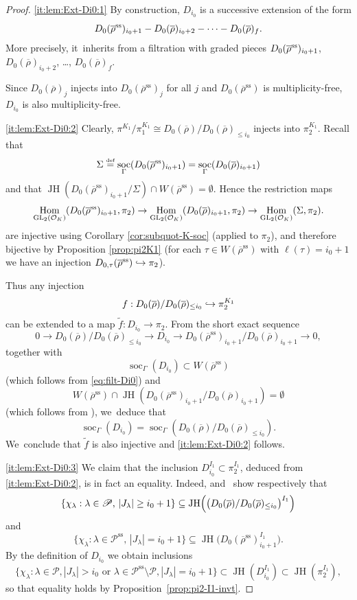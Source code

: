 \documentclass[JEP,XML,SOM,Unicode,NoFloatCountersInSection, NoEqCountersInSection,published]{cedram}
\newcommand\hto{\mathrel{\lhook\joinrel\to}}
\let\wt\widetilde
\newcommand{\defeq}{\stackrel{\textrm{\tiny{\upshape{def}}}}{=}}
\newcommand{\cO}{\mathcal{O}}
\renewcommand{\P}{\mathscr P}
\renewcommand{\ss}{\mathrm{ss}}
\newcommand{\brho}{\overline{\rho}}
\DeclareMathOperator{\GL}{GL}
\DeclareMathOperator{\Hom}{Hom}
\DeclareMathOperator{\JH}{\mathrm{JH}}
\DeclareMathOperator{\soc}{soc}
\theoremstyle{plain}
\theoremstyle{definition}
\begin{document}
\skpt
\begin{proof}
\eqref{it:lem:Ext-Di0:1}
By construction, $D_{i_0}$ is a successive extension of the form
\begin{equation}\label{eq:filt-Di0}D_{0}(\brho^{\rm ss})_{i_0+1} \-- D_0(\brho)_{i_0+2}\-- \cdots\-- D_0(\brho)_{f}.
\end{equation}
More precisely, it~inherits from \cite[Eq.\,(65)]{BHHMS4} a filtration with graded pieces $D_{0}(\brho^{\rm ss})_{i_0+1}$, $D_0(\brho)_{i_0+2}$, \dots, $D_0(\brho)_{f}$.

Since $D_{0}(\brho)_j$ injects into $D_0(\brho^{\ss})_j$ for all $j$ and $D_0(\brho^{\ss})$ is multiplicity-free, $D_{i_0}$ is also multiplicity-free.

\eqref{it:lem:Ext-Di0:2}
Clearly, $\pi^{K_1}/\pi_1^{K_1} \cong D_0(\brho)/D_0(\brho)_{\leq i_0}$ injects into $\pi_2^{K_1}$.
Recall that
\[
\Sigma\defeq \soc_{\Gamma} (D_0(\brho^{\ss})_{i_0+1}) =\soc_{\Gamma} (D_0(\brho)_{i_0+1})
\]
and that $\JH(D_0(\brho^{\ss})_{i_0+1}/\Sigma) \cap W(\brho^\ss) = \emptyset$.
Hence the restriction maps
\begin{equation*}\let\ra\rightarrow
\Hom_{\GL_2(\cO_K)}(D_0(\brho^{\ss})_{i_0+1},\pi_2) \ra \Hom_{\GL_2(\cO_K)}(D_0(\brho)_{i_0+1},\pi_2) \ra \Hom_{\GL_2(\cO_K)}(\Sigma,\pi_2).
\end{equation*}
are injective using Corollary \ref{cor:subquot-K-soc} (applied to $\pi_2$), and therefore bijective by Proposition \ref{prop:pi2K1} (for each $\tau \in W(\brho^\ss)$ with $\ell(\tau)=i_0+1$ we have an injection $D_{0,\tau}(\brho^\ss) \hto \pi_2$).

Thus any injection
\[
f: D_0(\brho)/D_0(\brho)_{\leq i_0} \hto \pi_2^{K_1}
\]
can be extended to a map $\wt f: D_{i_0} \to \pi_2$.
From the short exact sequence
\[
0 \to D_0(\brho)/D_0(\brho)_{\le i_0} \to D_{i_0} \to D_0(\brho^{\ss})_{i_0+1}/D_0(\brho)_{i_0+1} \to 0,
\]
together with
\[
\soc_\Gamma(D_{i_0})\subset W(\brho^\ss)
\]
(which follows from \eqref{eq:filt-Di0}) and
\[
W(\brho^\ss) \cap \JH( D_0(\brho^\ss)_{i_0+1}/D_0(\brho)_{i_0+1} )=\emptyset
\]
(which follows from \cite[Eq.\,(66)]{BHHMS4}), we~deduce that
\[
\soc_{\Gamma}(D_{i_0})=\soc_{\Gamma}(D_0(\brho)/D_0(\brho)_{\le i_0}).
\]
We~conclude that $\wt f$ is also injective and \eqref{it:lem:Ext-Di0:2} follows.

\eqref{it:lem:Ext-Di0:3}
We claim that the inclusion $D_{i_0}^{I_1} \subset \pi_2^{I_1}$, deduced from \eqref{it:lem:Ext-Di0:2}, is in fact an equality.
Indeed, \cite[Cor.\,4.3.16]{BHHMS4} and~\cite[Lem.\,3.1.3]{BHHMS4} show respectively that
\[
\{ \chi_\lambda: \text{$\lambda \in \P$, $|J_\lambda| \geq i_0+1$}\}\subseteq \JH\Bigl(\bigl(D_0(\brho)/D_0(\brho)_{\le i_0}\bigr)^{I_1}\Bigr)
\]
and
\[
\{\chi_\lambda: \text{$\lambda \in \P^{\ss}$, $|J_\lambda| = i_0+1$}\}\subseteq \JH\bigl(D_0(\brho^\ss)_{i_0+1}^{I_1}\bigr).
\]
By the definition of $D_{i_0}$ we obtain inclusions
\begin{equation*}
\{ \chi_\lambda: \text{$\lambda \in \P, |J_\lambda| > i_0$ or $\lambda \in \P^\ss \setminus \P, |J_\lambda| = i_0+1$} \} \subset \JH(D_{i_0}^{I_1}) \subset \JH(\pi_2^{I_1}),
\end{equation*}
so that equality holds by Proposition~\ref{prop:pi2-I1-invt}.


\end{proof}
\end{document}
